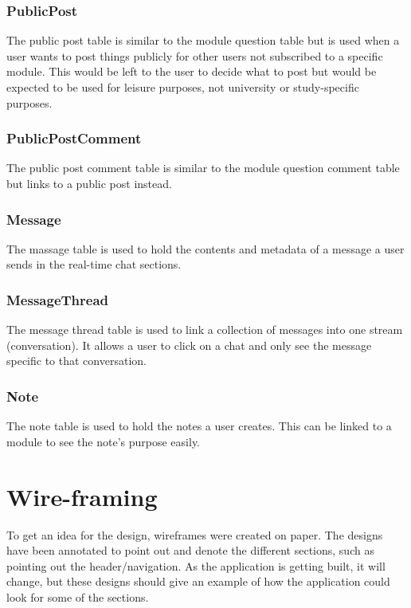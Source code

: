 \subsubsection{PublicPost}
The public post table is similar to the module question table but is used when a user wants to post things publicly for other users not subscribed to a specific module. This would be left to the user to decide what to post but would be expected to be used for leisure purposes, not university or study-specific purposes.

\subsubsection{PublicPostComment}
The public post comment table is similar to the module question comment table but links to a public post instead.

\subsubsection{Message}
The massage table is used to hold the contents and metadata of a message a user sends in the real-time chat sections.

\subsubsection{MessageThread}
The message thread table is used to link a collection of messages into one stream (conversation). It allows a user to click on a chat and only see the message specific to that conversation.

\subsubsection{Note}
The note table is used to hold the notes a user creates. This can be linked to a module to see the note's purpose easily.

\section{Wire-framing}

To get an idea for the design, wireframes were created on paper. The designs have been annotated to point out and denote the different sections, such as pointing out the header/navigation. As the application is getting built, it will change, but these designs should give an example of how the application could look for some of the sections.

